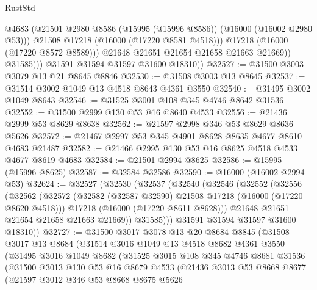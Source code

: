 \begin{lexlean}{RustStd}
\begin{coremodule}
                      @4683
                      (@21501 @2980 @8586 (@15995 (@15996 @8586)) (@16000 (@16002 @2980 @53)))
                      @21508
                      @17218
                      (@16000 (@17220 @8581 @4518)))
                    @17218
                    (@16000 (@17220 @8572 @8589)))
                  @21648
                  @21651
                  @21654
                  @21658
                  @21663
                  @21669))
              @31585)))
        @31591
        @31594
        @31597
        @31600
        @18310))
@32527 := @31500 @3003 @3079 @13 @21 @8645 @8846
@32530 := @31508 @3003 @13 @8645
@32537 := @31514 @3002 @1049 @13 @4518 @8643 @4361 @3550
@32540 := @31495 @3002 @1049 @8643
@32546 := @31525 @3001 @108 @345 @4746 @8642 @31536
@32552 := @31500 @2999 @130 @53 @16 @8640 @4533
@32556 := @21436 @2999 @53 @8629 @8638
@32562 := @21597 @2998 @346 @53 @8629 @8636 @5626
@32572 := @21467 @2997 @53 @345 @4901 @8628 @8635 @4677 @8610 @4683 @21487
@32582 := @21466 @2995 @130 @53 @16 @8625 @4518 @4533 @4677 @8619 @4683
@32584 := @21501 @2994 @8625
@32586 := @15995 (@15996 @8625)
@32587 := @32584 @32586
@32590 := @16000 (@16002 @2994 @53)
@32624 := @32527
    (@32530
      (@32537
        (@32540
          (@32546
            (@32552
              (@32556
                (@32562
                  (@32572
                    (@32582 (@32587 @32590) @21508 @17218 (@16000 (@17220 @8620 @4518)))
                    @17218
                    (@16000 (@17220 @8611 @8628)))
                  @21648
                  @21651
                  @21654
                  @21658
                  @21663
                  @21669))
              @31585)))
        @31591
        @31594
        @31597
        @31600
        @18310))
@32727 := @31500
    @3017
    @3078
    @13
    @20
    @8684
    @8845
    (@31508
      @3017
      @13
      @8684
      (@31514
        @3016
        @1049
        @13
        @4518
        @8682
        @4361
        @3550
        (@31495
          @3016
          @1049
          @8682
          (@31525
            @3015
            @108
            @345
            @4746
            @8681
            @31536
            (@31500
              @3013
              @130
              @53
              @16
              @8679
              @4533
              (@21436
                @3013
                @53
                @8668
                @8677
                (@21597
                  @3012
                  @346
                  @53
                  @8668
                  @8675
                  @5626

\end{coremodule}
\end{lexlean}
